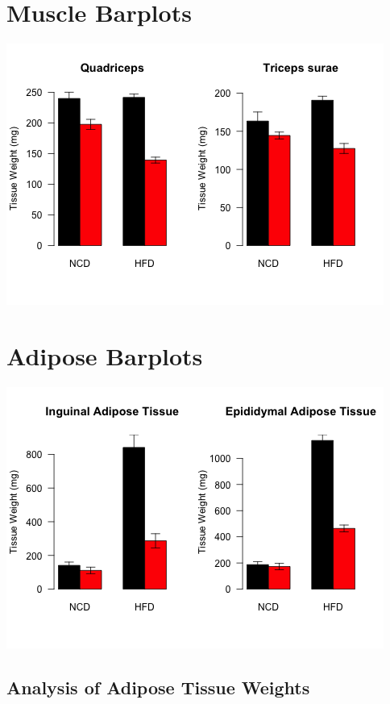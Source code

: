 \documentclass[]{article}
\begin{document}
\section{Muscle Barplots}\label{muscle-barplots}

\includegraphics{figures/muscle-weight-barplot-1.png}

\section{Adipose Barplots}\label{adipose-barplots}

\includegraphics{figures/adipose-weight-barplot-1.png}

\subsection{Analysis of Adipose Tissue
Weights}\label{analysis-of-adipose-tissue-weights}
\end{document}
